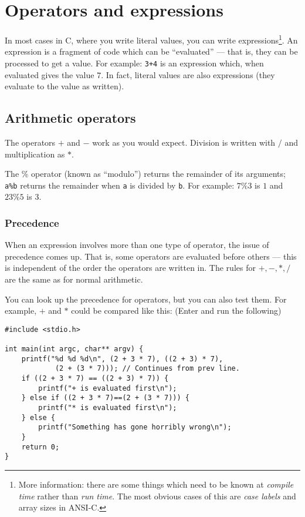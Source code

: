 
\chapter{Operators and expressions}


In most cases in C, where you write literal values, you can write expressions\footnote{More information:
there are some things which need to be known at \emph{compile time} rather than \emph{run time}.
The most obvious cases of this are \emph{case labels} and array sizes in ANSI-C.}.
An expression is a fragment of code which can be ``evaluated'' --- that is, they can be processed to get a value.
For example:
\texttt{3+4} is an expression which, when evaluated gives the value $7$.
In fact, literal values are also expressions (they evaluate to the value as written).

\section{Arithmetic operators}

The operators $+$ and $-$ work as you would expect.
Division is written with $/$ and multiplication as $*$.

The \% operator (known as ``modulo'') returns the remainder of its arguments;
\texttt{a\%b} returns the remainder when \texttt{a} is divided by \texttt{b}.
For example: $7\%3$ is $1$   and $23\%5$ is $3$.


\subsection{Precedence}
When an expression involves more than one type of operator, the issue of precedence comes up.
That is, some operators are evaluated before others --- this is independent of the order the operators are written in.
The rules for $+,-,*,/$ are the same as for normal arithmetic.

You can look up the precedence for operators, but you can also test them.
For example, $+$ and $*$ could be compared like this:
(Enter and run the following)
\begin{lstlisting}
#include <stdio.h>

int main(int argc, char** argv) {
    printf("%d %d %d\n", (2 + 3 * 7), ((2 + 3) * 7),
            (2 + (3 * 7))); // Continues from prev line.
    if ((2 + 3 * 7) == ((2 + 3) * 7)) {
        printf("+ is evaluated first\n");    
    } else if ((2 + 3 * 7)==(2 + (3 * 7))) {
        printf("* is evaluated first\n");
    } else {
        printf("Something has gone horribly wrong\n");
    }
    return 0;
}
\end{lstlisting} 

